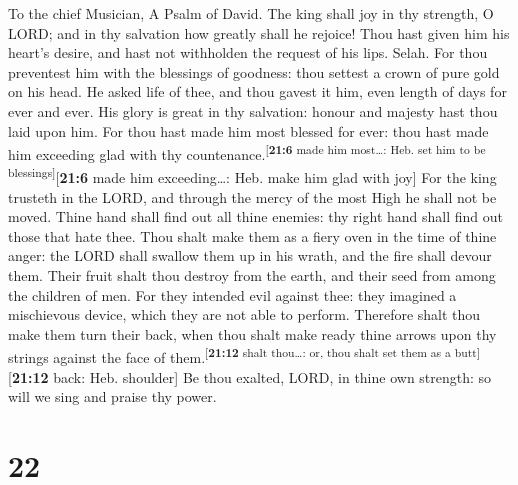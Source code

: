 To the chief Musician, A Psalm of David.  The king shall
joy in thy strength, O LORD; and in thy salvation how greatly shall he
rejoice!  Thou hast given him his heart's desire, and hast
not withholden the request of his lips. Selah.  For thou
preventest him with the blessings of goodness: thou settest a crown of
pure gold on his head.  He asked life of thee, and thou
gavest it him, even length of days for ever and ever.  His
glory is great in thy salvation: honour and majesty hast thou laid upon
him.  For thou hast made him most blessed for ever: thou
hast made him exceeding glad with thy
countenance.\textsuperscript{{[}\textbf{21:6} made him most\ldots: Heb.
set him to be blessings{]}}{[}\textbf{21:6} made him exceeding\ldots:
Heb. make him glad with joy{]}  For the king trusteth in
the LORD, and through the mercy of the most High he shall not be moved.
 Thine hand shall find out all thine enemies: thy right
hand shall find out those that hate thee.  Thou shalt make
them as a fiery oven in the time of thine anger: the LORD shall swallow
them up in his wrath, and the fire shall devour them. 
Their fruit shalt thou destroy from the earth, and their seed from among
the children of men.  For they intended evil against
thee: they imagined a mischievous device, which they are not able to
perform.  Therefore shalt thou make them turn their back,
when thou shalt make ready thine arrows upon thy strings against the
face of them.\textsuperscript{{[}\textbf{21:12} shalt thou\ldots: or,
thou shalt set them as a butt{]}}{[}\textbf{21:12} back: Heb.
shoulder{]}  Be thou exalted, LORD, in thine own
strength: so will we sing and praise thy power.

\hypertarget{section-21}{%
\section{22}\label{section-21}}

